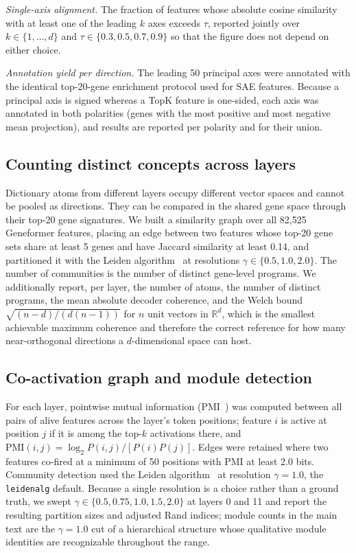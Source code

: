 \documentclass[onecolumn,11pt]{article}
\begin{document}
\emph{Single-axis alignment.} The fraction of features whose absolute cosine similarity with at
least one of the leading $k$ axes exceeds $\tau$, reported jointly over
$k \in \{1, \dots, d\}$ and $\tau \in \{0.3, 0.5, 0.7, 0.9\}$ so that the figure does not depend on
either choice.

\emph{Annotation yield per direction.} The leading 50 principal axes were annotated with the
identical top-20-gene enrichment protocol used for SAE features. Because a principal axis is signed
whereas a TopK feature is one-sided, each axis was annotated in both polarities (genes with the
most positive and most negative mean projection), and results are reported per polarity and for
their union.

\subsection*{Counting distinct concepts across layers}

Dictionary atoms from different layers occupy different vector spaces and cannot be pooled as
directions. They can be compared in the shared gene space through their top-20 gene signatures. We
built a similarity graph over all 82,525 Geneformer features, placing an edge between two features
whose top-20 gene sets share at least 5 genes and have Jaccard similarity at least 0.14, and
partitioned it with the Leiden algorithm~\cite{traag2019louvain} at resolutions
$\gamma \in \{0.5, 1.0, 2.0\}$. The number of communities is the number of distinct gene-level
programs. We additionally report, per layer, the number of atoms, the number of distinct programs,
the mean absolute decoder coherence, and the Welch bound
$\sqrt{(n-d)/(d(n-1))}$ for $n$ unit vectors in $\mathbb{R}^{d}$, which is the smallest achievable
maximum coherence and therefore the correct reference for how many near-orthogonal directions a
$d$-dimensional space can host.

\subsection*{Co-activation graph and module detection}

For each layer, pointwise mutual information (PMI~\cite{manning1999foundations}) was computed
between all pairs of alive features across the layer's token positions; feature $i$ is active at
position $j$ if it is among the top-$k$ activations there, and
$\text{PMI}(i,j) = \log_2 P(i,j) / [P(i)P(j)]$. Edges were retained where two features co-fired at
a minimum of 50 positions with PMI at least 2.0 bits. Community detection used the Leiden algorithm~\cite{traag2019louvain} at
resolution $\gamma = 1.0$, the \texttt{leidenalg} default. Because a single resolution is a choice
rather than a ground truth, we swept $\gamma \in \{0.5, 0.75, 1.0, 1.5, 2.0\}$ at layers 0 and 11
and report the resulting partition sizes and adjusted Rand indices; module counts in the main text
are the $\gamma{=}1.0$ cut of a hierarchical structure whose qualitative module identities are
recognizable throughout the range.
\end{document}
